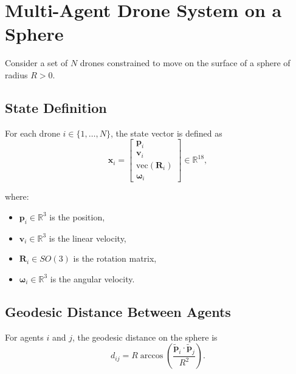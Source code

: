 \documentclass{article}
\begin{document}
    \newpage

    \newpage

    \renewcommand{\contentsname}{Table of contents}
    \tableofcontents %
    \newpage

    \renewcommand{\listfigurename}{List of Images}
    \listoffigures
    \newpage

\section*{Multi-Agent Drone System on a Sphere}

Consider a set of $N$ drones constrained to move on the surface of a sphere of radius $R > 0$.

\subsection*{State Definition}

For each drone $i \in \{1,\dots,N\}$, the state vector is defined as
\begin{equation}
    \bm{x}_i =
    \begin{bmatrix}
    \bm{p}_i \\
    \bm{v}_i \\
    \mathrm{vec}(\bm{R}_i) \\
    \bm{\omega}_i
    \end{bmatrix}
    \in \mathbb{R}^{18},
\end{equation}

where:
\begin{itemize}
    \item $\bm{p}_i \in \mathbb{R}^3$ is the position,
    \item $\bm{v}_i \in \mathbb{R}^3$ is the linear velocity,
    \item $\bm{R}_i \in SO(3)$ is the rotation matrix,
    \item $\bm{\omega}_i \in \mathbb{R}^3$ is the angular velocity.
\end{itemize}

\subsection*{Geodesic Distance Between Agents}

For agents $i$ and $j$, the geodesic distance on the sphere is
\begin{equation}
    d_{ij} = R \arccos\!\left(
    \frac{\tilde{\bm{p}}_i \cdot \tilde{\bm{p}}_j}{R^2}
    \right).    
\end{equation}
\end{document}
